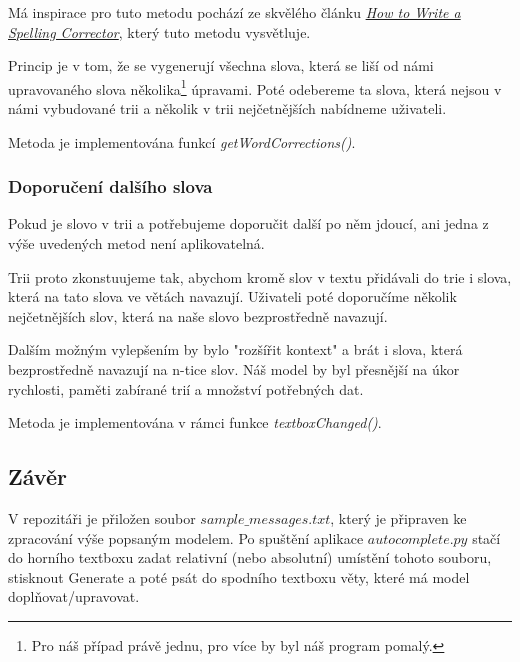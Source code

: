 \documentclass[a4paper, 12pt]{article}
\begin{document}
  Má inspirace pro tuto metodu pochází ze skvělého článku \textit{\href{http://norvig.com/spell-correct.html}{How to Write a Spelling Corrector}}, který tuto metodu vysvětluje.

  Princip je v tom, že se vygenerují všechna slova, která se liší od námi upravovaného slova několika\footnote{Pro náš případ právě jednu, pro více by byl náš program pomalý.} úpravami. Poté odebereme ta slova, která nejsou v námi vybudované trii a několik v trii nejčetnějších nabídneme uživateli.

  Metoda je implementována funkcí \textit{getWordCorrections()}.

  \subsubsection{Doporučení dalšího slova}
  Pokud je slovo v trii a potřebujeme doporučit další po něm jdoucí, ani jedna z výše uvedených metod není aplikovatelná.

  Trii proto zkonstuujeme tak, abychom kromě slov v textu přidávali do trie i slova, která na tato slova ve větách navazují. Uživateli poté doporučíme několik nejčetnějších slov, která na naše slovo bezprostředně navazují.

  Dalším možným vylepšením by bylo "rozšířit kontext" a brát i slova, která bezprostředně navazují na n-tice slov. Náš model by byl přesnější na úkor rychlosti, paměti zabírané trií a množství potřebných dat.

  Metoda je implementována v rámci funkce \textit{textboxChanged()}.

  \subsection{Závěr}
  V repozitáři je přiložen soubor $sample\_messages.txt$, který je připraven ke zpracování výše popsaným modelem. Po spuštění aplikace $autocomplete.py$ stačí do horního textboxu zadat relativní (nebo absolutní) umístění tohoto souboru, stisknout Generate a poté psát do spodního textboxu věty, které má model doplňovat/upravovat.
\end{document}
